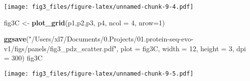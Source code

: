 \documentclass[
]{article}
\newenvironment{Shaded}{\begin{snugshade}}{\end{snugshade}}
\newcommand{\AttributeTok}[1]{\textcolor[rgb]{0.13,0.29,0.53}{#1}}
\newcommand{\DecValTok}[1]{\textcolor[rgb]{0.00,0.00,0.81}{#1}}
\newcommand{\FunctionTok}[1]{\textcolor[rgb]{0.13,0.29,0.53}{\textbf{#1}}}
\newcommand{\NormalTok}[1]{#1}
\newcommand{\OtherTok}[1]{\textcolor[rgb]{0.56,0.35,0.01}{#1}}
\newcommand{\StringTok}[1]{\textcolor[rgb]{0.31,0.60,0.02}{#1}}
\begin{document}
\texttt{[image: fig3\_files/figure-latex/unnamed-chunk-9-4.pdf]}

\begin{Shaded}
\begin{Highlighting}[]
\NormalTok{fig3C }\OtherTok{\textless{}{-}} \FunctionTok{plot\_grid}\NormalTok{(p1,p2,p3, p4, }\AttributeTok{ncol =} \DecValTok{4}\NormalTok{, }\AttributeTok{nrow=}\DecValTok{1}\NormalTok{)}

\FunctionTok{ggsave}\NormalTok{(}\StringTok{"/Users/xl7/Documents/0.Projects/01.protein{-}seq{-}evo{-}v1/figs/panels/fig3\_pdz\_scatter.pdf"}\NormalTok{, }
       \AttributeTok{plot =}\NormalTok{ fig3C, }\AttributeTok{width =} \DecValTok{12}\NormalTok{, }\AttributeTok{height =} \DecValTok{3}\NormalTok{, }\AttributeTok{dpi =} \DecValTok{300}\NormalTok{)}
\NormalTok{fig3C}
\end{Highlighting}
\end{Shaded}

\texttt{[image: fig3\_files/figure-latex/unnamed-chunk-9-5.pdf]}
\end{document}
